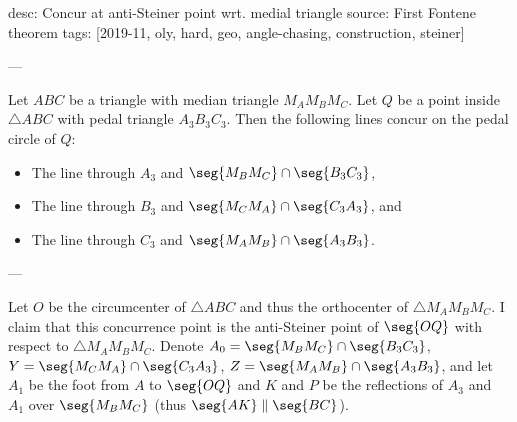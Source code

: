 desc: Concur at anti-Steiner point wrt. medial triangle
source: First Fontene theorem
tags: [2019-11, oly, hard, geo, angle-chasing, construction, steiner]

---

Let $ABC$ be a triangle with median triangle $M_AM_BM_C$. Let $Q$ be a point inside $\triangle ABC$ with pedal triangle $A_3B_3C_3$. Then the following lines concur on the pedal circle of $Q$:
\begin{itemize}[itemsep=0em]
    \item The line through $A_3$ and $\seg{M_BM_C}\cap\seg{B_3C_3}$,
    \item The line through $B_3$ and $\seg{M_CM_A}\cap\seg{C_3A_3}$, and
    \item The line through $C_3$ and $\seg{M_AM_B}\cap\seg{A_3B_3}$.
\end{itemize}

---

Let $O$ be the circumcenter of $\triangle ABC$ and thus the orthocenter of $\triangle M_AM_BM_C$. I claim that this concurrence point is the anti-Steiner point of $\seg{OQ}$ with respect to $\triangle M_AM_BM_C$. Denote $A_0=\seg{M_BM_C}\cap\seg{B_3C_3}$, $Y=\seg{M_CM_A}\cap\seg{C_3A_3}$, $Z=\seg{M_AM_B}\cap\seg{A_3B_3}$, and let $A_1$ be the foot from $A$ to $\seg{OQ}$ and $K$ and $P$ be the reflections of $A_3$ and $A_1$ over $\seg{M_BM_C}$ (thus $\seg{AK}\parallel\seg{BC}$).

